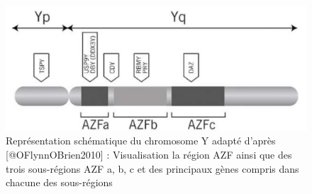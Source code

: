 \documentclass[12pt,twoside]{reedthesis}
\theoremstyle{definition}
\theoremstyle{definition}
\theoremstyle{remark}
\begin{document}
  \begin{figure}
  
  {\centering \includegraphics[scale=.45]{figure/chromozomeY} 
  
  }
  
  \caption[Représentation schématique du chromosome Y adapté]{Représentation schématique du chromosome Y adapté d'après [@OFlynnOBrien2010] : Visualisation la région AZF ainsi que des trois sous-régions AZF a, b, c et des principaux gènes compris dans chacune des sous-régions}\label{fig:chry}
  \end{figure}
  
\end{document}
